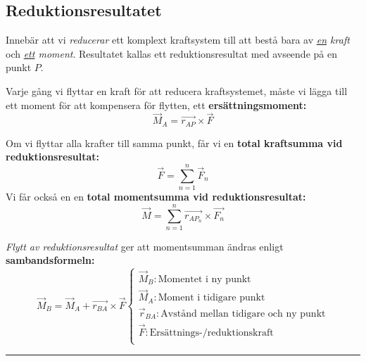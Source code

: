 \documentclass{article}
\newenvironment{ankiflashcard}[1]{}{}
\newcommand{\ruler}{
\rule{0.5\textwidth}{0.5pt}
}
\begin{document}
\begin{paracol}{2}
\begin{ankiflashcard}{Ange definitionen för reduktionsresultat.}
\subsection{Reduktionsresultatet}
Innebär att vi \textit{reducerar} ett komplext kraftsystem till att bestå bara av \textit{\underline{en} kraft} och \textit{\underline{ett} moment}. Resultatet kallas ett reduktionsresultat med avseende på en punkt $P$.
\end{ankiflashcard}

\begin{ankiflashcard}{Ange formeln för ersättningsmoment}
Varje gång vi flyttar en kraft för att reducera kraftsystemet, måste vi lägga till ett moment för att  kompensera för flytten, ett \newline
\textbf{ersättningsmoment:}
 $$
 \vec M_A = \vec{r_{AP}} \times \vec F
$$
\end{ankiflashcard}

\begin{ankiflashcard}{Definera kraftsumma och momentsumma vid reduktionsresultat.}
Om vi flyttar alla krafter till samma punkt, får vi en \textbf{total kraftsumma vid reduktionsresultat:}
$$
\vec F = \overset{n}{\underset{n=1}{\sum}} \vec F_n
$$
Vi får också en en \textbf{total momentsumma vid reduktionsresultat:}
$$
\vec M = \overset{n}{\underset{n=1}{\sum}} \vec{r_{AP_n}} \times \vec{F_n}
$$

\end{ankiflashcard}


\begin{ankiflashcard}{Ange formeln för flytt av reduktionsresultat.}
    \textit{Flytt av reduktionsresultat} ger att momentsumman ändras enligt \textbf{sambandsformeln:}
$$
\vec M_B = \vec M_A + \vec{r_{BA}} \times \vec F\left\{\begin{array}{l}\vec M_B: \text{Momentet i ny punkt} \\\vec M_A: \text{Moment i tidigare punkt} \\\vec r_{BA}: \text{Avstånd mellan tidigare och ny punkt} \\\vec F: \text{Ersättnings-/reduktionskraft} \\\end{array}\right.$$
\end{ankiflashcard}
\ruler


\end{paracol}
\end{document}
